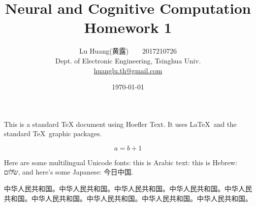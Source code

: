 \documentclass[11pt]{article}
\title{\textbf{Neural and Cognitive Computation \\
	{Homework 1}}}
\author{ {Lu Huang(黄露)~~~~2017210726 }\\
	Dept. of Electronic Engineering, Tsinghua Univ. \\
	\url{huanglu.th@gmail.com}}
\date{\today}
\begin{document}
\maketitle

This is a standard TeX document using Hoefler Text. It uses \LaTeX\ and
the standard \TeX\ graphic packages.

$$
a=b+1
$$

 Here are some multilingual Unicode fonts: this is Arabic text: 
this is Hebrew: {\H שלום}, and here's some Japanese: {\song 今日中国}.

中华人民共和国。中华人民共和国。中华人民共和国。中华人民共和国。中华人民共和国。中华人民共和国。中华人民共和国。中华人民共和国。中华人民共和国。
\end{document}
